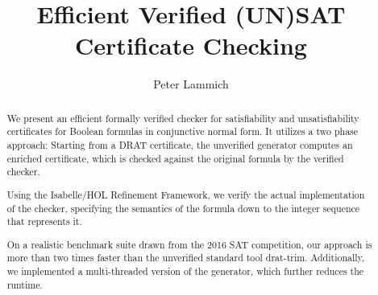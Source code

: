 \documentclass{llncs}
\begin{document}
\title{Efficient Verified (UN)SAT Certificate Checking}

\author{Peter Lammich}


\maketitle

\begin{abstract}
We present an efficient formally verified checker for satisfiability and unsatisfiability certificates for 
Boolean formulas in conjunctive normal form. 
It utilizes a two phase approach: Starting from a DRAT certificate, the unverified generator computes an enriched certificate,
which is checked against the original formula by the verified checker.

Using the Isabelle/HOL Refinement Framework, we verify the actual implementation of the checker, specifying the semantics of the formula down to the integer sequence that represents it.

On a realistic benchmark suite drawn from the 2016 SAT competition, our approach is more than two times faster than the unverified standard tool drat-trim.
Additionally, we implemented a multi-threaded version of the generator, which further reduces the runtime.
\end{abstract}

% 
% 
\end{document}
